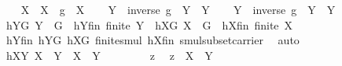 \begin{isabellebody}
\ \ \isamarkupfalse%
\ {\isacharquery}{\kern0pt}X{}\ {\isacharequal}{\kern0pt}\ {\isachardoublequoteopen}{\isacharparenleft}{\kern0pt}X\ {\isasymcdots}\ {\isacharbraceleft}{\kern0pt}g{\isacharbraceright}{\kern0pt}{\isacharparenright}{\kern0pt}\ {\isasymunion}\ X{\isachardoublequoteclose}\isanewline
\ \ \isamarkupfalse%
\ {\isacharquery}{\kern0pt}Y{}\ {\isacharequal}{\kern0pt}\ {\isachardoublequoteopen}{\isacharparenleft}{\kern0pt}{\isacharbraceleft}{\kern0pt}inverse\ g{\isacharbraceright}{\kern0pt}\ {\isasymcdots}\ Y{\isacharparenright}{\kern0pt}\ {\isasymunion}\ Y{\isachardoublequoteclose}\isanewline
\ \ \isamarkupfalse%
\ {\isacharquery}{\kern0pt}Y{}\ {\isacharequal}{\kern0pt}\ {\isachardoublequoteopen}{\isacharparenleft}{\kern0pt}{\isacharbraceleft}{\kern0pt}inverse\ g{\isacharbraceright}{\kern0pt}\ {\isasymcdots}\ Y{\isacharparenright}{\kern0pt}\ {\isasyminter}\ Y{\isachardoublequoteclose}\isanewline
\ \ \isamarkupfalse%
\ hY{}G{\isacharcolon}{\kern0pt}\ {\isachardoublequoteopen}{\isacharquery}{\kern0pt}Y{}\ {\isasymsubseteq}\ G{\isachardoublequoteclose}\ \ hY{}fin{\isacharcolon}{\kern0pt}\ {\isachardoublequoteopen}finite\ {\isacharquery}{\kern0pt}Y{}{\isachardoublequoteclose}\ \ hX{}G{\isacharcolon}{\kern0pt}\ {\isachardoublequoteopen}{\isacharquery}{\kern0pt}X{}\ {\isasymsubseteq}\ G{\isachardoublequoteclose}\ \ hX{}fin{\isacharcolon}{\kern0pt}\ {\isachardoublequoteopen}finite\ {\isacharquery}{\kern0pt}X{}{\isachardoublequoteclose}\ \isanewline
\ \ \ \ \isamarkupfalse%
\ hYfin\ hYG\ hXG\ finite{\isacharunderscore}{\kern0pt}smul\ hXfin\ smul{\isacharunderscore}{\kern0pt}subset{\isacharunderscore}{\kern0pt}carrier\ \isamarkupfalse%
\ auto\isanewline
\ \ \isamarkupfalse%
\ hXY{}{\isacharcolon}{\kern0pt}\ {\isachardoublequoteopen}{\isacharquery}{\kern0pt}X{}\ {\isasymcdots}\ {\isacharquery}{\kern0pt}Y{}\ {\isasymsubseteq}\ X\ {\isasymcdots}\ Y{\isachardoublequoteclose}\isanewline
\ \ \isamarkupfalse%
\isanewline
\ \ \ \ \isamarkupfalse%
\ z\ \isamarkupfalse%
\ {\isachardoublequoteopen}z\ {\isasymin}\ {\isacharquery}{\kern0pt}X{}\ {\isasymcdots}\ {\isacharquery}{\kern0pt}Y{}{\isachardoublequoteclose}\isanewline
\ \ \ \ \isamarkupfalse%

\end{isabellebody}
